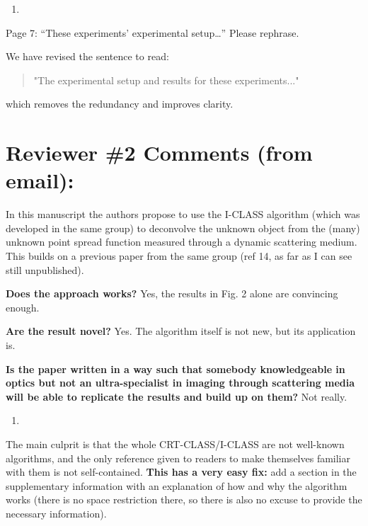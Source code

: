 \documentclass[12pt]{article}
\newenvironment{solved_reviewercomment}
    {\begin{tcolorbox}[width=\linewidth,colback=gray!5,colframe=solved_commentcolor!50,title=Reviewer Comment,left=5pt,right=5pt]}
    {\end{tcolorbox}}
\newenvironment{ourresponse}
    {\begin{tcolorbox}[width=\linewidth,breakable,enhanced,colback=gray!5,colframe=responsecolor!50,title=Response,left=5pt,right=5pt]}
    {\end{tcolorbox}}
\begin{document}
\begin{enumerate}[label=\arabic*., resume]
\item \leavevmode
\end{enumerate}
\vspace{-1em}
\begin{solved_reviewercomment}
    Page 7: “These experiments’ experimental setup…” Please rephrase.
\end{solved_reviewercomment}

\begin{ourresponse}
    We have revised the sentence to read: 
    \begin{quote}
        "The experimental setup and results for these experiments..." 
    \end{quote}
    which removes the redundancy and improves clarity.
\end{ourresponse}


\newpage

\section{Reviewer \#2 Comments (from email):}

In this manuscript the authors propose to use the I-CLASS algorithm (which was developed in the same group) to deconvolve the unknown object from the (many) unknown point spread function measured through a dynamic scattering medium. This builds on a previous paper from the same group (ref 14, as far as I can see still unpublished).

\textbf{Does the approach works?} Yes, the results in Fig. 2 alone are convincing enough.

\textbf{Are the result novel?} Yes. The algorithm itself is not new, but its application is.

\textbf{Is the paper written in a way such that somebody knowledgeable in optics but not an ultra-specialist in imaging through scattering media will be able to replicate the results and build up on them?} Not really. 

\begin{enumerate}[label=\arabic*.]
\item \leavevmode
\end{enumerate}
\vspace{-1em}
\begin{solved_reviewercomment}
    The main culprit is that the whole CRT-CLASS/I-CLASS are not well-known algorithms, and the only reference given to readers to make themselves familiar with them is not self-contained. \textbf{This has a very easy fix:} add a section in the supplementary information with an explanation of how and why the algorithm works (there is no space restriction there, so there is also no excuse to provide the necessary information).
\end{solved_reviewercomment}
\end{document}
